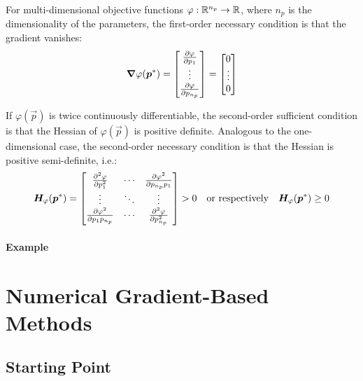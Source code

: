 			For multi-dimensional objective functions \( \varphi : \mathbb{R}^{n_p} \to \mathbb{R} \), where \(n_p\) is the dimensionality of the parameters, the first-order necessary condition is that the gradient vanishes:
			\begin{align*}
				\grad{\varphi}(\bm{p}^\ast) =
				\begin{bmatrix}
					\pdv{\varphi}{p_1} \\
					\vdots             \\
					\pdv{\varphi}{p_{n_p}}
				\end{bmatrix}
				=
				\begin{bmatrix}
					0      \\
					\vdots \\
					0
				\end{bmatrix}
			\end{align*}

			If \(\varphi(\vec{p})\) is twice continuously differentiable, the second-order sufficient condition is that the Hessian of \(\varphi(\vec{p})\) is positive definite. Analogous to the one-dimensional case, the second-order necessary condition is that the Hessian is positive semi-definite, i.e.:
			\begin{align*}
				\bm{H}_\varphi(\bm{p}^\ast) =
				\begin{bmatrix}
					\pdv[2]{\varphi}{p_1}        & \cdots & \pdv{\varphi^2}{p_{n_p} p_1} \\
					\vdots                       & \ddots & \vdots                       \\
					\pdv{\varphi^2}{p_1 p_{n_p}} & \cdots & \pdv[2]{\varphi}{p_{n_p}}
				\end{bmatrix}
				> 0
				\quad\text{or respectively}\quad
				\bm{H}_\varphi(\bm{p}^\ast) \geq 0
			\end{align*}

			\paragraph{Example} %

	\section{Numerical Gradient-Based Methods}
		\subsection{Starting Point}
